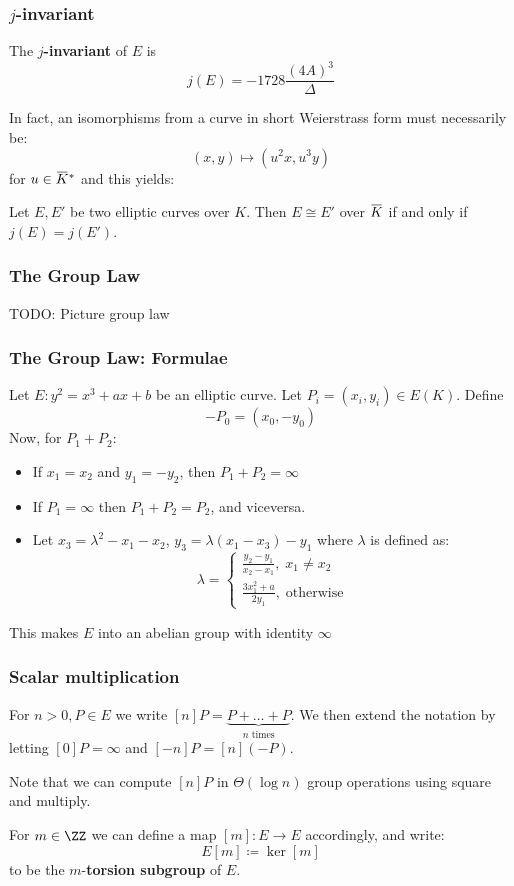 \documentclass{beamer}
\newcommand{\overbar}[1]{\mkern 1.5mu\overline{\mkern-1.5mu#1\mkern-1.5mu}\mkern 1.5mu}
\begin{document}
\begin{frame}
    \frametitle{$j$-invariant}
    \begin{definition}
         The $j$\textbf{-invariant} of $E$ is
            \[ j(E) = -1728 \frac{(4 A)^3}{\Delta} \]
    \end{definition} 
    In fact, an isomorphisms from a curve in short Weierstrass form must necessarily be:
    \[ (x, y) \mapsto (u^2 x, u^3 y) \]
    for $u \in \overbar{K}^*$ and this yields:
     \begin{theorem}
        Let $E, E'$ be two elliptic curves over $K$. Then $E \cong E'$ over $\overbar{K}$ if and only if $j(E) = j(E')$. 
    \end{theorem}  
\end{frame}

\begin{frame}
    \frametitle{The Group Law} 
    TODO: Picture group law
\end{frame}

\begin{frame}
    \frametitle{The Group Law: Formulae}
    Let $E: y^2 = x^3 + a x + b$ be an elliptic curve. Let $P_i = (x_i, y_i) \in E(K)$. Define 
    \[ -P_0 = (x_0, -y_0 )\]
    Now, for $P_1 + P_2$: 
    \begin{itemize}
        \item If $x_1 = x_2$ and $y_1 = -y_2$, then $P_1 + P_2 = \infty$
        \item If $P_1 = \infty$ then $P_1 + P_2 = P_2$, and viceversa.
        \item Let $x_3 = \lambda^2 - x_1 - x_2$, $y_3 = \lambda(x_1 - x_3) - y_1$ where $\lambda$ is defined as:
        \[ \lambda = \begin{cases}
            \frac{y_2 - y_1}{x_2 - x_1}, \; x_1 \neq x_2 \\
            \frac{3 x_1^2 + a}{2y_1},\; \text{otherwise}
        \end{cases} \]
    \end{itemize}
    This makes $E$ into an abelian group with identity $\infty$ 
\end{frame}

\begin{frame}
    \frametitle{Scalar multiplication}
    For $n > 0, P \in E$ we write $[n]P = \underbrace{P + \dots + P}_{n \text{ times}}$. We then extend the notation by letting $[0]P = \infty$ and 
    $[-n]P = [n](-P)$.

    Note that we can compute $[n]P$ in $\Theta(\log n)$ group operations using square and multiply.

    For $m \in \ZZ$ we can define a map $[m]: E \to E$ accordingly, and write:
    \[ E[m] \coloneqq \ker[m] \]
    to be the $m$-\textbf{torsion subgroup} of $E$.
\end{frame}
\end{document}
